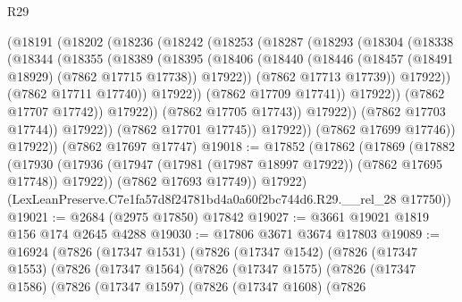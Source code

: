\begin{lexlean}{R29}
\begin{coremodule}
                        (@18191
                          (@18202
                            (@18236
                              (@18242
                                (@18253
                                  (@18287
                                    (@18293
                                      (@18304
                                        (@18338
                                          (@18344
                                            (@18355
                                              (@18389
                                                (@18395
                                                  (@18406
                                                    (@18440
                                                      (@18446
                                                        (@18457
                                                          (@18491 @18929)
                                                          (@7862 @17715 @17738))
                                                        @17922))
                                                    (@7862 @17713 @17739))
                                                  @17922))
                                              (@7862 @17711 @17740))
                                            @17922))
                                        (@7862 @17709 @17741))
                                      @17922))
                                  (@7862 @17707 @17742))
                                @17922))
                            (@7862 @17705 @17743))
                          @17922))
                      (@7862 @17703 @17744))
                    @17922))
                (@7862 @17701 @17745))
              @17922))
          (@7862 @17699 @17746))
        @17922))
    (@7862 @17697 @17747)
@19018 := @17852
    (@17862
      (@17869
        (@17882
          (@17930 (@17936 (@17947 (@17981 (@17987 @18997 @17922)) (@7862 @17695 @17748)) @17922))
          (@7862 @17693 @17749))
        @17922)
      (LexLeanPreserve.C7e1fa57d8f24781bd4a0a60f2bc744d6.R29.__rel_28 @17750))
@19021 := @2684 (@2975 @17850) @17842
@19027 := @3661 @19021 @1819 @156 @174 @2645 @4288
@19030 := @17806 @3671 @3674 @17803
@19089 := @16924
    (@7826
      (@17347 @1531)
      (@7826
        (@17347 @1542)
        (@7826
          (@17347 @1553)
          (@7826
            (@17347 @1564)
            (@7826
              (@17347 @1575)
              (@7826
                (@17347 @1586)
                (@7826
                  (@17347 @1597)
                  (@7826
                    (@17347 @1608)
                    (@7826

\end{coremodule}
\end{lexlean}
